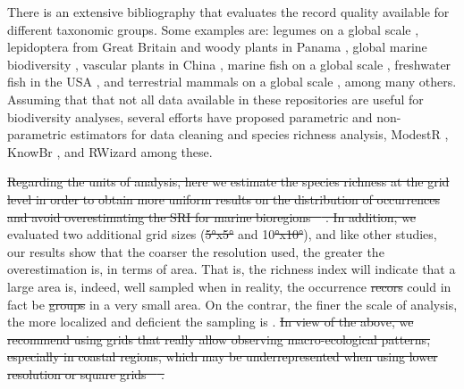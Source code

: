 \documentclass[12pt,authoryear]{elsarticle}
\providecommand{\DIFaddtex}[1]{{\protect\color{blue}\uwave{#1}}} %
\providecommand{\DIFdeltex}[1]{{\protect\color{red}\sout{#1}}}                      %
\providecommand{\DIFaddbegin}{} %
\providecommand{\DIFaddend}{} %
\providecommand{\DIFdelbegin}{} %
\providecommand{\DIFdelend}{} %
\providecommand{\DIFadd}[1]{\texorpdfstring{\DIFaddtex{#1}}{#1}} %
\providecommand{\DIFdel}[1]{\texorpdfstring{\DIFdeltex{#1}}{}} %
\begin{document}
There is an extensive bibliography that evaluates the record quality available for different taxonomic groups. Some examples are: legumes on a global scale \citep{yesson2007}, lepidoptera from Great Britain and woody plants in Panama \citep{chao2009}, global marine biodiversity \citep{tittensor2010global}, vascular plants in China \citep{yang2013geographical}, marine fish on a global scale \citep{mora2008completeness,garcia2015}, freshwater fish in the USA \citep{troia2017,pelayo2018}, and terrestrial mammals on a global scale \citep{oliver2021}, among many others. Assuming that that not all data available in these repositories are useful for biodiversity analyses, several efforts have proposed  parametric and non-parametric estimators for data cleaning and species richness analysis, ModestR \citep{garcia2013}, KnowBr \citep{lobo2018}, and RWizard \citep{guisande&lobo} among these.

\DIFdelbegin \DIFdel{Regarding the units of analysis, here we estimate the species richness at the grid level in order to obtain more uniform results on the distribution of occurrences and avoid overestimating the SRI for marine bioregions \mbox{%
\citep{pelayo2018}}\hspace{0pt}%
. In addition, we }\DIFdelend %
\DIFaddbegin \DIFadd{We }\DIFaddend evaluated two additional grid sizes (\DIFdelbegin \DIFdel{5°x5° }\DIFdelend \DIFaddbegin \DIFadd{i.e. 2.5$\times 10^4$  }\DIFaddend and 10\DIFdelbegin \DIFdel{°x10°}\DIFdelend \DIFaddbegin \DIFadd{$^7$ km$^2$}\DIFaddend ), and like other studies,
%
our results show that the coarser the resolution used, the greater the overestimation is, in terms of area. That is, the richness index will indicate that a large area is, indeed, well sampled when in reality, the occurrence \DIFdelbegin \DIFdel{recors }\DIFdelend \DIFaddbegin \DIFadd{records }\DIFaddend could in fact be \DIFdelbegin \DIFdel{groups }\DIFdelend \DIFaddbegin \DIFadd{localized }\DIFaddend in a very small area. On the contrar, the finer the scale of analysis, the more localized and deficient the sampling is
%
\citep{tittensor2010global,garcia2015,meyer2015,troia2016,troia2017}.
\DIFdelbegin \DIFdel{In view of the above, we recommend using grids that really allow observing macro-ecological patterns, especially in coastal regions, which may be underrepresented when using lower resolution or square grids \mbox{%
\citep{pelayo2018}}\hspace{0pt}%
.
}\DIFdelend %
\end{document}
